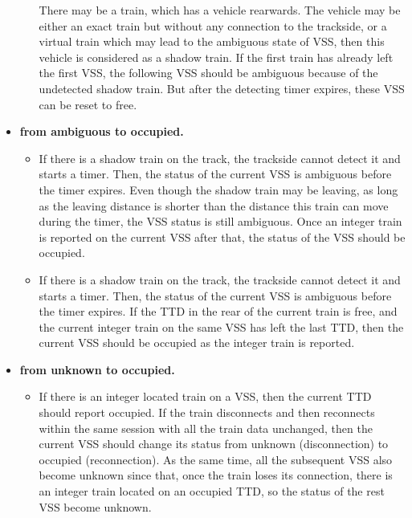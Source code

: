 \documentclass[article,dr=phil,type=msc,colorback,accentcolor=tud9c]{tudthesis}
\begin{document}
\begin{itemize}
\begin{itemize}
		There may be a train, which has a vehicle rearwards. The vehicle may be either an exact train but without any connection to the trackside, or a virtual train which may lead to the ambiguous state of VSS, then this vehicle is considered as a shadow train. If the first train has already left the first VSS, the following VSS should be ambiguous because of the undetected shadow train. But after the detecting timer expires, these VSS can be reset to free.
		
	\end{itemize}
	
	\item \textbf{from ambiguous to occupied.}
	
	\begin{itemize}
		
		\item 
		
		If there is a shadow train on the track, the trackside cannot detect it and starts a timer. Then, the status of the current VSS is ambiguous before the timer expires. Even though the shadow train may be leaving, as long as the leaving distance is shorter than the distance this train can move during the timer, the VSS status is still ambiguous. Once an integer train is reported on the current VSS after that, the status of the VSS should be occupied.
		
		\item 
		
		If there is a shadow train on the track, the trackside cannot detect it and starts a timer. Then, the status of the current VSS is ambiguous before the timer expires. If the TTD in the rear of the current train is free, and the current integer train on the same VSS has left the last TTD, then the current VSS should be occupied as the integer train is reported.
		
	\end{itemize}    	
	
	\item \textbf{from unknown to occupied.}
	
	\begin{itemize}
		
		\item 
		
		If there is an integer located train on a VSS, then the current TTD should report occupied. If the train disconnects and then reconnects within the same session with all the train data unchanged, then the current VSS should change its status from unknown (disconnection) to occupied (reconnection). As the same time, all the subsequent VSS also become unknown since that, once the train loses its connection, there is an integer train located on an occupied TTD, so the status of the rest VSS become unknown.
		

\end{itemize}
\end{itemize}
\end{document}
